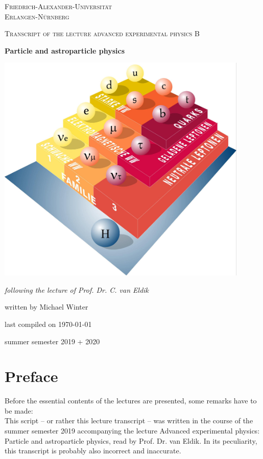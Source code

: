 \documentclass[headtopline=0.08em,headsepline=0.04em, bindingoffset = 5mm]{scrbook}
\numberwithin{equation}{chapter} %
\begin{document}
{
\begin{titlepage}
	\centering
	\vfill
	{\scshape\LARGE Friedrich-Alexander-Universität \\ Erlangen-Nürnberg \par}
	\vfill
	{\scshape\Large Transcript of the lecture advanced experimental physics B\\   \par}
	\vfill
	{\huge\bfseries Particle and astroparticle physics\par}
	\vfill
	\includegraphics[width=0.9\textwidth]{imgs/title.jpg}
	\vfill
	{\Large\itshape following the lecture of Prof. Dr. C. van Eldik\par}
	\vfill
	{\large written by Michael Winter \par}
    \vfill
    {\large last compiled on \today}
    \vfill
	{\large summer semester 2019 + 2020\par}
	\vfill
\end{titlepage}}

\tableofcontents %
\clearpage %

\chapter*{Preface}
Before the essential contents of the lectures are presented, some remarks have to be made:\\
This script -- or rather this lecture transcript -- was written in the course of the summer semester 2019 accompanying the lecture Advanced experimental physics: Particle and astroparticle physics, read by Prof. Dr. van Eldik. In its peculiarity, this transcript is probably also incorrect and inaccurate.
\end{document}
